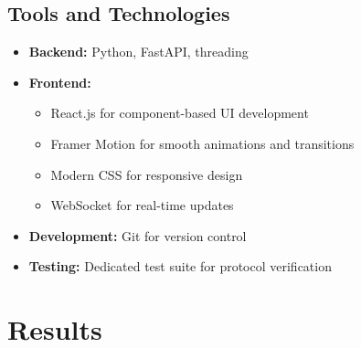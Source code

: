 \documentclass[a4paper,12pt]{article}
\begin{document}
\subsection{Tools and Technologies}
\begin{itemize}
    \item \textbf{Backend:} Python, FastAPI, threading
    \item \textbf{Frontend:} 
        \begin{itemize}
            \item React.js for component-based UI development
            \item Framer Motion for smooth animations and transitions
            \item Modern CSS for responsive design
            \item WebSocket for real-time updates
        \end{itemize}
    \item \textbf{Development:} Git for version control
    \item \textbf{Testing:} Dedicated test suite for protocol verification
\end{itemize}

\section{Results}
\end{document}
